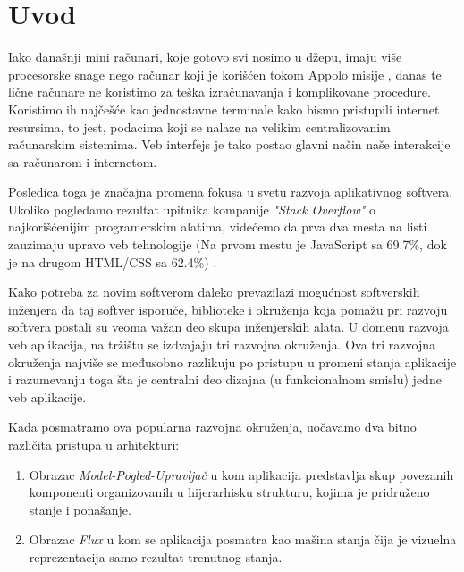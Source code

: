 \documentclass[12pt,oneside]{memoir}
\begin{document}
\frontmatter
\naslovna
\komisija
\apstrakt
\tableofcontents*

\mainmatter

\chapter{Uvod}
Iako današnji mini računari, koje gotovo svi nosimo u džepu, imaju više procesorske snage 
nego računar koji je korišćen tokom Appolo misije \cite{apollo}, 
danas te lične računare ne koristimo za teška izračunavanja i komplikovane procedure. 
Koristimo ih najčešće kao jednostavne terminale kako bismo pristupili internet resursima,
to jest, podacima koji se nalaze na velikim centralizovanim računarskim sistemima. 
Veb interfejs je tako postao glavni način naše interakcije sa računarom i internetom.

Posledica toga je značajna promena fokusa u svetu razvoja aplikativnog softvera.
Ukoliko pogledamo rezultat upitnika kompanije \emph{"Stack Overflow"}
o najkorišćenijim programerskim alatima, videćemo da prva dva mesta na listi
zauzimaju upravo veb tehnologije (Na prvom mestu je JavaScript sa 69.7\%, dok je na 
drugom HTML/CSS sa 62.4\%) \cite{StackOverflowSurvey}.

Kako potreba za novim softverom daleko prevazilazi mogućnost softverskih inženjera 
da taj softver isporuče, biblioteke i okruženja koja pomažu pri razvoju softvera 
postali su veoma važan deo skupa inženjerskih alata.
U domenu razvoja veb aplikacija, na tržištu se izdvajaju tri razvojna okruženja. 
Ova tri razvojna okruženja najviše se međusobno razlikuju po pristupu u promeni 
stanja aplikacije i razumevanju
toga šta je centralni deo dizajna (u funkcionalnom smislu) jedne veb aplikacije.

Kada posmatramo ova popularna razvojna okruženja, uočavamo dva bitno različita 
pristupa u arhitekturi:
\begin{enumerate}
  \item Obrazac \emph{Model-Pogled-Upravljač} u kom aplikacija predstavlja skup
   povezanih komponenti organizovanih u hijerarhisku strukturu, kojima je 
   pridruženo stanje i ponašanje.
  \item Obrazac \emph{Flux} u kom se aplikacija posmatra kao mašina stanja čija je 
  vizuelna reprezentacija samo rezultat trenutnog stanja.
\end{enumerate}
\end{document}

